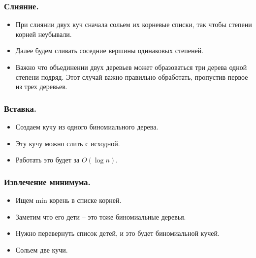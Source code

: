 \documentclass[a4paper,14pt]{article}
\begin{document}
    \subsubsection*{Слияние.}
    \begin{itemize}
        \item При слиянии двух куч сначала сольем их корневые списки, так
        чтобы степени корней неубывали.
        \item Далее будем сливать соседние вершины одинаковых степеней.
        \item Важно что объединении двух деревьев может образоваться три
        дерева одной степени подряд. Этот случай важно правильно
        обработать, пропустив первое из трех деревьев.
    \end{itemize}
    \subsubsection*{Вставка.}
    \begin{itemize}
        \item Создаем кучу из одного биномиального дерева.
        \item Эту кучу можно слить с исходной.
        \item Работать это будет за $O(\log n)$.
    \end{itemize}
    \subsubsection*{Извлечение минимума.}
    \begin{itemize}
        \item Ищем min корень в списке корней.
        \item Заметим что его дети – это тоже биномиальные деревья.
        \item Нужно перевернуть список детей, и это будет биномиальной
        кучей.
        \item Сольем две кучи.
    \end{itemize}
\end{document}
